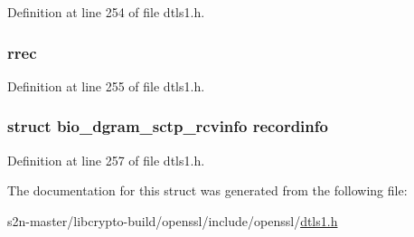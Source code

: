 Definition at line 254 of file dtls1.\+h.

\subsubsection[{\texorpdfstring{rrec}{rrec}}]{ rrec}\hypertarget{structdtls1__record__data__st_a4f4654e61a104fc84503bb658507d673}{}\label{structdtls1__record__data__st_a4f4654e61a104fc84503bb658507d673}


Definition at line 255 of file dtls1.\+h.

\subsubsection[{\texorpdfstring{recordinfo}{recordinfo}}]{\setlength{\rightskip}{0pt plus 5cm}struct {\bf bio\+\_\+dgram\+\_\+sctp\+\_\+rcvinfo} recordinfo}\hypertarget{structdtls1__record__data__st_a0089d43b7c64e871febcfe7a79ce286d}{}\label{structdtls1__record__data__st_a0089d43b7c64e871febcfe7a79ce286d}


Definition at line 257 of file dtls1.\+h.



The documentation for this struct was generated from the following file\+:\begin{DoxyCompactItemize}
\item 
s2n-\/master/libcrypto-\/build/openssl/include/openssl/\hyperlink{include_2openssl_2dtls1_8h}{dtls1.\+h}\end{DoxyCompactItemize}
